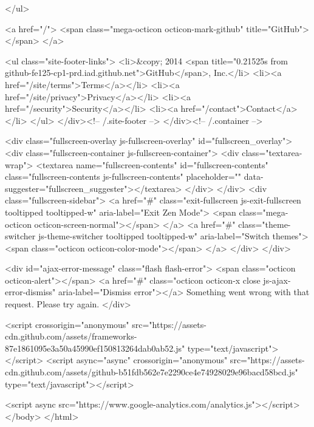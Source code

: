     </ul>

    <a href="/">
      <span class="mega-octicon octicon-mark-github" title="GitHub"></span>
    </a>

    <ul class="site-footer-links">
      <li>&copy; 2014 <span title="0.21525s from github-fe125-cp1-prd.iad.github.net">GitHub</span>, Inc.</li>
        <li><a href="/site/terms">Terms</a></li>
        <li><a href="/site/privacy">Privacy</a></li>
        <li><a href="/security">Security</a></li>
        <li><a href="/contact">Contact</a></li>
    </ul>
  </div><!-- /.site-footer -->
</div><!-- /.container -->


    <div class="fullscreen-overlay js-fullscreen-overlay" id="fullscreen_overlay">
  <div class="fullscreen-container js-fullscreen-container">
    <div class="textarea-wrap">
      <textarea name="fullscreen-contents" id="fullscreen-contents" class="fullscreen-contents js-fullscreen-contents" placeholder="" data-suggester="fullscreen_suggester"></textarea>
    </div>
  </div>
  <div class="fullscreen-sidebar">
    <a href="#" class="exit-fullscreen js-exit-fullscreen tooltipped tooltipped-w" aria-label="Exit Zen Mode">
      <span class="mega-octicon octicon-screen-normal"></span>
    </a>
    <a href="#" class="theme-switcher js-theme-switcher tooltipped tooltipped-w"
      aria-label="Switch themes">
      <span class="octicon octicon-color-mode"></span>
    </a>
  </div>
</div>



    <div id="ajax-error-message" class="flash flash-error">
      <span class="octicon octicon-alert"></span>
      <a href="#" class="octicon octicon-x close js-ajax-error-dismiss" aria-label="Dismiss error"></a>
      Something went wrong with that request. Please try again.
    </div>


      <script crossorigin="anonymous" src="https://assets-cdn.github.com/assets/frameworks-87e1861095e3a50a45990ef150813264dab0ab52.js" type="text/javascript"></script>
      <script async="async" crossorigin="anonymous" src="https://assets-cdn.github.com/assets/github-b51fdb562e7e2290ce4e74928029e96bacd58bcd.js" type="text/javascript"></script>
      
      
        <script async src="https://www.google-analytics.com/analytics.js"></script>
  </body>
</html>

